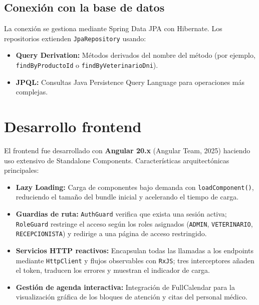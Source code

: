 \documentclass[11pt,a4paper]{report}
\begin{document}
\subsection{Conexión con la base de datos}
La conexión se gestiona mediante Spring Data JPA con Hibernate. Los repositorios extienden \texttt{JpaRepository} usando:
\begin{itemize}
\item \textbf{Query Derivation:} Métodos derivados del nombre del método (por ejemplo, \texttt{findByProductoId} o \texttt{findByVeterinarioDni}).
\item \textbf{JPQL:} Consultas Java Persistence Query Language para operaciones más complejas.
\end{itemize}

\section{Desarrollo frontend}
El frontend fue desarrollado con \textbf{Angular 20.x} (Angular Team, 2025) haciendo uso extensivo de Standalone Components. Características arquitectónicas principales:
\begin{itemize}
\item \textbf{Lazy Loading:} Carga de componentes bajo demanda con \texttt{loadComponent()}, reduciendo el tamaño del bundle inicial y acelerando el tiempo de carga.
\item \textbf{Guardias de ruta:} \texttt{AuthGuard} verifica que exista una sesión activa; \texttt{RoleGuard} restringe el acceso según los roles asignados (\texttt{ADMIN}, \texttt{VETERINARIO}, \texttt{RECEPCIONISTA}) y redirige a una página de acceso restringido.
\item \textbf{Servicios HTTP reactivos:} Encapsulan todas las llamadas a los endpoints mediante \texttt{HttpClient} y flujos observables con \texttt{RxJS}; tres interceptores añaden el token, traducen los errores y muestran el indicador de carga.
\item \textbf{Gestión de agenda interactiva:} Integración de FullCalendar para la visualización gráfica de los bloques de atención y citas del personal médico.
\end{itemize}
\end{document}
